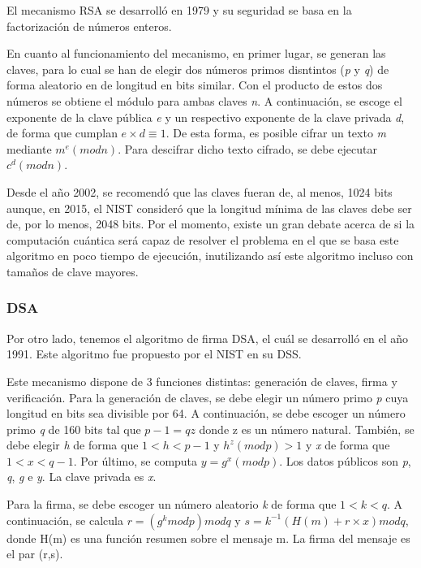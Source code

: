 El mecanismo RSA se desarrolló en 1979 y su seguridad se basa en la factorización de números enteros.

En cuanto al funcionamiento del mecanismo, en primer lugar, se generan las claves, para lo cual se han de elegir dos números primos disntintos (\textit{p} y \textit{q}) de forma aleatorio en de longitud en bits similar.
Con el producto de estos dos números se obtiene el módulo para ambas claves \textit{n}.
A continuación, se escoge el exponente de la clave pública \textit{e} y un respectivo exponente de la clave privada \textit{d}, de forma que cumplan $e\times d\equiv 1$.
De esta forma, es posible cifrar un texto \textit{m} mediante $m^{e} (mod n)$.
Para descifrar dicho texto cifrado, se debe ejecutar $c^{d} (mod n)$.

Desde el año 2002, se recomendó que las claves fueran de, al menos, 1024 bits aunque, en 2015, el \ac{NIST} consideró que la longitud mínima de las claves debe ser de, por lo menos, 2048 bits.
Por el momento, existe un gran debate acerca de si la computación cuántica será capaz de resolver el problema en el que se basa este algoritmo en poco tiempo de ejecución, inutilizando así este algoritmo incluso con tamaños de clave mayores.


\subsubsection{DSA}\label{subsubsec:dsa}

Por otro lado, tenemos el algoritmo de firma DSA, el cuál se desarrolló en el año 1991.
Este algoritmo fue propuesto por el \ac{NIST} en su \ac{DSS}.

Este mecanismo dispone de 3 funciones distintas: generación de claves, firma y verificación.
Para la generación de claves, se debe elegir un número primo \textit{p} cuya longitud en bits sea divisible por 64.
A continuación, se debe escoger un número primo \textit{q} de 160 bits tal que $p-1=qz$ donde z es un número natural.
También, se debe elegir \textit{h} de forma que $1 < h < p-1$ y $h^z (mod p) > 1$ y \textit{x} de forma que $1 < x < q-1$.
Por último, se computa $y=g^x(mod p)$.
Los datos públicos son \textit{p}, \textit{q}, \textit{g} e \textit{y}.
La clave privada es \textit{x}.

Para la firma, se debe escoger un número aleatorio \textit{k} de forma que $1 < k < q$.
A continuación, se calcula $r = (g^k mod p) mod q$ y $s = k^{-1} (H(m) + r\times x) mod q$, donde H(m) es una función resumen sobre el mensaje m.
La firma del mensaje es el par (r,s).

